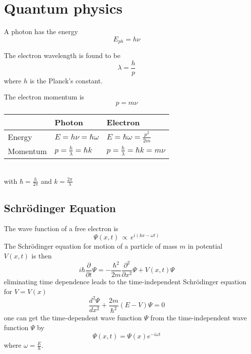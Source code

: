 \section{Quantum physics}

A photon has the energy
\begin{equation}
    E_{ph} = h \nu
\end{equation}

The electron wavelength is found to be
\begin{equation}
    \lambda = \frac{h}{p}
\end{equation}
where $h$ is the Planck's constant.

The electron momentum is 
\begin{equation}
    p = m \nu
\end{equation}

\begin{table}[ht!]
    \centering
    \begin{tabular}{lll}
        & Photon & Electron \\ \toprule
        Energy & $E = h \nu = \hbar \omega$ & $E = \hbar \omega = \frac{p^2}{2m}$ \\
        Momentum & $p = \frac{h}{\lambda} = \hbar k$ & $p = \frac{h}{\lambda} = \hbar k = m \nu$ \\ \bottomrule
    \end{tabular} \\
     with $\hbar = \frac{h}{2\pi}$ and $k = \frac{2\pi}{\lambda}$
\end{table}

\subsection{Schrödinger Equation}
The wave function of a free electron is
\begin{equation}
    \Psi(x,t) \,\propto\, e^{i (kx-\omega t)}
\end{equation}
The Schrödinger equation for motion of a particle of mass $m$ in potential $V(x,t)$ is then
\begin{equation}
    i \hbar \frac{\partial}{\partial t} \Psi = - \frac{\hbar^2}{2m}\frac{\partial^2}{\partial x^2} \Psi + V(x,t) \Psi
\end{equation}
eliminating time dependence leads to the time-independent Schrödinger equation for $V=V(x)$
\begin{equation}
    \frac{d^2 \varPsi}{d x^2} + \frac{2m}{\hbar^2}(E-V) \varPsi = 0
\end{equation}
one can get the time-dependent wave function $\Psi$ from the time-independent wave function $\varPsi$ by
\begin{equation}
    \Psi(x,t) = \varPsi(x) e^{-i \omega t}
\end{equation}
where $\omega = \frac{E}{\hbar}$.

